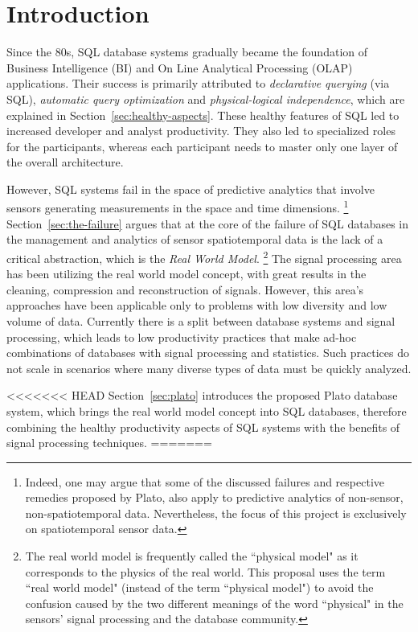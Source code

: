 
\section{Introduction}
\label{sec:introduction}
Since the 80s, SQL database systems gradually became the foundation of Business Intelligence (BI) and On Line Analytical Processing (OLAP) applications. Their success is primarily attributed to {\em declarative querying} (via SQL), {\em automatic query optimization} and {\em physical-logical independence}, which are explained in Section~\ref{sec:healthy-aspects}. These healthy features of SQL led to increased developer and analyst productivity. They also led to specialized roles for the participants, whereas each participant needs to master only one layer of the overall architecture. 

However, SQL systems fail in the space of predictive analytics that involve sensors generating measurements in the space and time dimensions.%
\footnote{Indeed, one may argue that some of the discussed failures and respective remedies proposed by Plato, also apply to predictive analytics of non-sensor, non-spatiotemporal data. Nevertheless, the focus of this project is exclusively on spatiotemporal sensor data.
}
Section~\ref{sec:the-failure} argues that at the core of the failure of SQL databases in the management and analytics of sensor spatiotemporal data is the lack of a critical abstraction, which is the {\em Real World Model}.%
\footnote{The real world model is frequently called the ``physical model" as it corresponds to the physics of the real world. This proposal uses the term ``real world model" (instead of the term ``physical model") to avoid the confusion caused by the two different meanings of the word ``physical" in the sensors' signal processing and the database community.
}
The signal processing area has been utilizing the real world model concept, with great results in the cleaning, compression and reconstruction of signals. However, this area's approaches have been applicable only to problems with low diversity and low volume of data. 
Currently there is a split between database systems and signal processing, which leads to low productivity practices that make ad-hoc combinations of databases with signal processing and statistics. Such practices do not scale in scenarios where many diverse types of data must be quickly analyzed. 

<<<<<<< HEAD
Section~\ref{sec:plato} introduces the proposed Plato database system, which brings the real world model concept into SQL databases, therefore combining the healthy productivity aspects of SQL systems with the benefits of signal processing techniques.
=======
